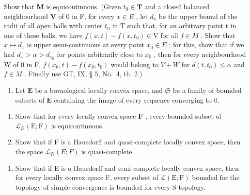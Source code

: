 Show that \(\mathbf{M}\) is equicontinuous. (Given \(t_0 \in \mathbf{T}\) and a closed balanced neighbourhood \(\mathbf{V}\) of 0 in F, for every \(x \in E\) , let \(d_{x}\) be the upper bound of the radii of all open balls with center \(t_{0}\) in T such that, for an arbitrary point t in one of these balls, we have \(f(x, t) - f(x, t_{0}) \in \mathrm{V}\) for all \(f \in M\) . Show that \(x \mapsto d_{x}\) is upper semi-continuous at every point \(x_{0} \in E\) ; for this, show that if we had \(d_{x} > \alpha > d_{x_{0}}\) for points arbitrarily close to \(x_{0}\) , then for every neighbourhood W of 0 in F, \(f(x_{0}, t) - f(x_{0}, t_{0})\) would belong to \(V + W\) for \(d(t, t_{0}) \leqslant \alpha\) and \(f \in M\) . Finally use GT, IX, § 5, No.~4, th. 2.)

\begin{enumerate}
\def\labelenumi{\arabic{enumi})}
\setcounter{enumi}{11}
\tightlist
\item
  Let \(\mathbf{E}\) be a bornological locally convex space, and \(\mathfrak{S}\) be a family of bounded subsets of \(\mathbf{E}\) containing the image of every sequence converging to 0.
\end{enumerate}

\begin{enumerate}
\def\labelenumi{\alph{enumi})}
\item
  Show that for every locally convex space \(\mathbf{F}\) , every bounded subset of \(\mathcal{L}_{\mathfrak{S}}(\mathrm{E};\mathrm{F})\) is equicontinuous.
\item
  Show that if F is a Hausdorff and quasi-complete locally convex space, then the space \(\mathcal{L}_{\mathfrak{S}}(E;F)\) is quasi-complete.
\end{enumerate}

\begin{enumerate}
\def\labelenumi{\arabic{enumi})}
\setcounter{enumi}{12}
\tightlist
\item
  Show that if E is a Hausdorff and semi-complete locally convex space, then for every locally convex space F, every subset of \(\mathcal{L}(\mathrm{E};\mathrm{F})\) bounded for the topology of simple convergence is bounded for every S-topology.
\end{enumerate}

